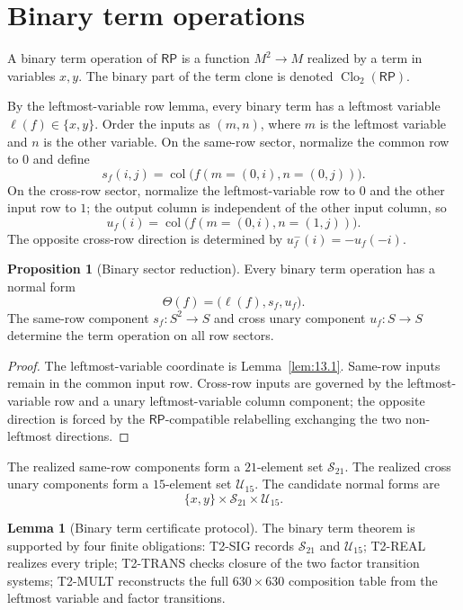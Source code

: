 \documentclass[11pt]{article}
\theoremstyle{definition}
\newtheorem{lemma}[theorem]{Lemma}
\newtheorem{proposition}[theorem]{Proposition}
\newcommand{\RP}{\mathsf{RP}}
\begin{document}
\section{Binary term operations}\label{binary-term-functions}\label{binary-term-algebra}

A binary term operation of \(\RP\) is a function \(M^2\to M\) realized by a
term in variables \(x,y\).  The binary part of the term clone is denoted
\(\operatorname{Clo}_2(\RP)\).

By the leftmost-variable row lemma, every binary term has a leftmost variable
\(\ell(f)\in\{x,y\}\).  Order the inputs as \((m,n)\), where \(m\) is the
leftmost variable and \(n\) is the other variable.  On the same-row sector,
normalize the common row to \(0\) and define
\[
s_f(i,j)=\operatorname{col}\bigl(f(m=(0,i),n=(0,j))\bigr).
\]
On the cross-row sector, normalize the leftmost-variable row to \(0\) and the
other input row to \(1\); the output column is independent of the other input
column, so
\[
u_f(i)=\operatorname{col}\bigl(f(m=(0,i),n=(1,j))\bigr).
\]
The opposite cross-row direction is determined by \(u_f^{-}(i)=-u_f(-i)\).

\begin{proposition}[Binary sector reduction]
\label{prop:18.1}
Every binary term operation has a normal form
\[
\Theta(f)=\bigl(\ell(f),s_f,u_f\bigr).
\]
The same-row component \(s_f:S^2\to S\) and cross unary component
\(u_f:S\to S\) determine the term operation on all row sectors.
\end{proposition}

\begin{proof}
The leftmost-variable coordinate is Lemma~\ref{lem:13.1}.  Same-row inputs
remain in the common input row.  Cross-row inputs are governed by the
leftmost-variable row and a unary leftmost-variable column component; the
opposite direction is forced by the \(\RP\)-compatible relabelling exchanging
the two non-leftmost directions.
\end{proof}

The realized same-row components form a \(21\)-element set \(\mathcal S_{21}\).
The realized cross unary components form a \(15\)-element set
\(\mathcal U_{15}\).  The candidate normal forms are
\[
\{x,y\}\times\mathcal S_{21}\times\mathcal U_{15}.
\]

\begin{lemma}[Binary term certificate protocol]
\label{lem:18.2}
The binary term theorem is supported by four finite obligations: T2-SIG records
\(\mathcal S_{21}\) and \(\mathcal U_{15}\); T2-REAL realizes every triple;
T2-TRANS checks closure of the two factor transition systems; T2-MULT
reconstructs the full \(630\times630\) composition table from the leftmost variable and
factor transitions.
\end{lemma}
\end{document}
